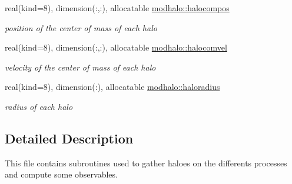 \begin{DoxyCompactItemize}
real(kind=8), dimension(\+:,\+:), allocatable \hyperlink{namespacemodhalo_a872c41ce5ed017bb6f443156dd18d0af}{modhalo\+::halocompos}
\begin{DoxyCompactList}\small\item\em position of the center of mass of each halo \end{DoxyCompactList}\item 
real(kind=8), dimension(\+:,\+:), allocatable \hyperlink{namespacemodhalo_ad9aa6bd557e4766c0d1d612e203a1e67}{modhalo\+::halocomvel}
\begin{DoxyCompactList}\small\item\em velocity of the center of mass of each halo \end{DoxyCompactList}\item 
real(kind=8), dimension(\+:), allocatable \hyperlink{namespacemodhalo_ac245616b2bd1db72ab7891e811f668de}{modhalo\+::haloradius}
\begin{DoxyCompactList}\small\item\em radius of each halo \end{DoxyCompactList}\end{DoxyCompactItemize}


\subsection{Detailed Description}
This file contains subroutines used to gather haloes on the differents processes and compute some observables. 

